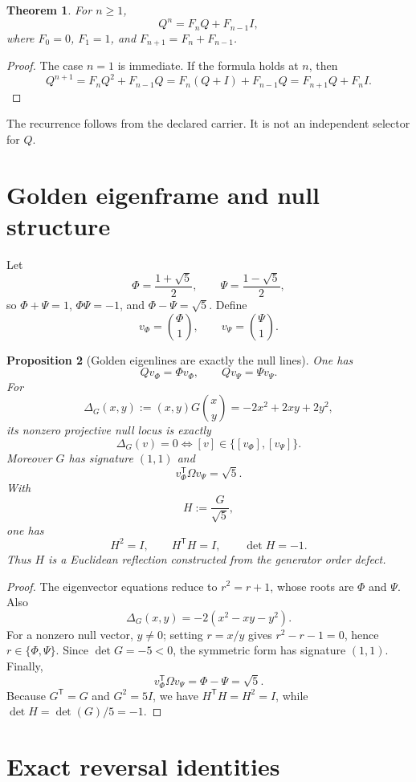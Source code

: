 \documentclass[11pt]{article}
\newtheorem{theorem}{Theorem}[section]
\newtheorem{proposition}[theorem]{Proposition}
\theoremstyle{definition}
\begin{document}
\begin{theorem}
For $n\ge1$,
\[
\boxed{Q^n=F_nQ+F_{n-1}I},
\]
where $F_0=0$, $F_1=1$, and $F_{n+1}=F_n+F_{n-1}$.
\end{theorem}

\begin{proof}
The case $n=1$ is immediate. If the formula holds at $n$, then
\[
Q^{n+1}=F_nQ^2+F_{n-1}Q
=F_n(Q+I)+F_{n-1}Q
=F_{n+1}Q+F_nI.
\]
\end{proof}

The recurrence follows from the declared carrier. It is not an independent selector for $Q$.

\section{Golden eigenframe and null structure}

Let
\[
\Phi=\frac{1+\sqrt5}{2},\qquad
\Psi=\frac{1-\sqrt5}{2},
\]
so $\Phi+\Psi=1$, $\Phi\Psi=-1$, and $\Phi-\Psi=\sqrt5$. Define
\[
v_\Phi=\binom{\Phi}{1},\qquad
v_\Psi=\binom{\Psi}{1}.
\]

\begin{proposition}[Golden eigenlines are exactly the null lines]
One has
\[
Qv_\Phi=\Phi v_\Phi,\qquad Qv_\Psi=\Psi v_\Psi.
\]
For
\[
\Delta_G(x,y):=(x,y)G\binom{x}{y}
=-2x^2+2xy+2y^2,
\]
its nonzero projective null locus is exactly
\[
\Delta_G(v)=0
\iff
[v]\in\{[v_\Phi],[v_\Psi]\}.
\]
Moreover $G$ has signature $(1,1)$ and
\[
v_\Phi^{\mathsf T}\Omega v_\Psi=\sqrt5.
\]
With
\[
H:=\frac{G}{\sqrt5},
\]
one has
\[
H^2=I,\qquad H^{\mathsf T}H=I,\qquad \det H=-1.
\]
Thus $H$ is a Euclidean reflection constructed from the generator order defect.
\end{proposition}

\begin{proof}
The eigenvector equations reduce to $r^2=r+1$, whose roots are $\Phi$ and $\Psi$. Also
\[
\Delta_G(x,y)=-2(x^2-xy-y^2).
\]
For a nonzero null vector, $y\neq0$; setting $r=x/y$ gives $r^2-r-1=0$, hence $r\in\{\Phi,\Psi\}$. Since $\det G=-5<0$, the symmetric form has signature $(1,1)$. Finally,
\[
v_\Phi^{\mathsf T}\Omega v_\Psi=\Phi-\Psi=\sqrt5.
\]
Because $G^{\mathsf T}=G$ and $G^2=5I$, we have $H^{\mathsf T}H=H^2=I$, while $\det H=\det(G)/5=-1$.
\end{proof}

\section{Exact reversal identities}
\end{document}
